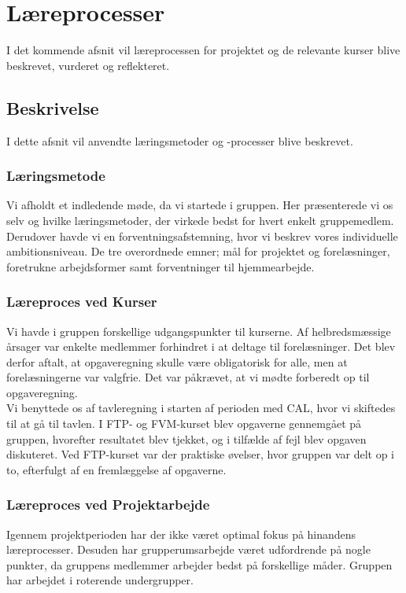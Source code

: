 \chapter{Læreprocesser}
I det kommende afsnit vil læreprocessen for projektet og de relevante kurser blive beskrevet, vurderet og reflekteret.

\section{Beskrivelse}
I dette afsnit vil anvendte læringsmetoder og -processer blive beskrevet.

\subsection{Læringsmetode}
Vi afholdt et indledende møde, da vi startede i gruppen. Her præsenterede vi os selv og hvilke læringsmetoder, der virkede bedst for hvert enkelt gruppemedlem. Derudover havde vi en forventningsafstemning, hvor vi beskrev vores individuelle ambitionsniveau. De tre overordnede emner; mål for projektet og forelæsninger, foretrukne arbejdsformer samt forventninger til hjemmearbejde. \\

\subsection{Læreproces ved Kurser}
Vi havde i gruppen forskellige udgangspunkter til kurserne. Af helbredsmæssige årsager var enkelte medlemmer forhindret i at deltage til forelæsninger. Det blev derfor aftalt, at opgaveregning skulle være obligatorisk for alle, men at forelæsningerne var valgfrie. Det var påkrævet, at vi mødte forberedt op til opgaveregning. \\
Vi benyttede os af tavleregning i starten af perioden med CAL, hvor vi skiftedes til at gå til tavlen. I FTP- og FVM-kurset blev opgaverne gennemgået på gruppen, hvorefter resultatet blev tjekket, og i tilfælde af fejl blev opgaven diskuteret. Ved FTP-kurset var der praktiske øvelser, hvor gruppen var delt op i to, efterfulgt af en fremlæggelse af opgaverne. 
  
\subsection{Læreproces ved Projektarbejde}
Igennem projektperioden har der ikke været optimal fokus på hinandens læreprocesser. Desuden har grupperumsarbejde været udfordrende på nogle punkter, da gruppens medlemmer arbejder bedst på forskellige måder. Gruppen har arbejdet i roterende undergrupper.

